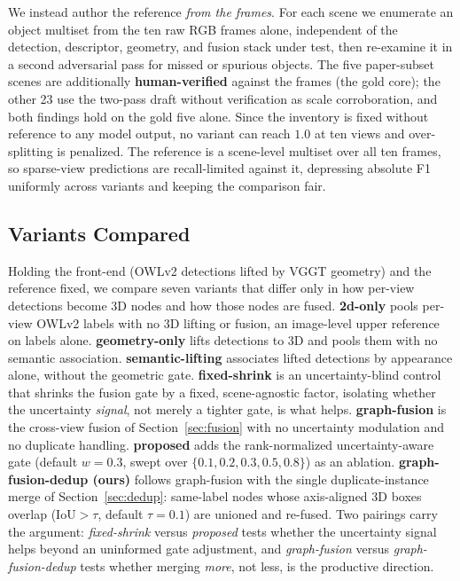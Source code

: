 We instead author the reference \emph{from the frames}. For each scene we enumerate an object multiset from the ten raw RGB frames alone, independent of the detection, descriptor, geometry, and fusion stack under test, then re-examine it in a second adversarial pass for missed or spurious objects. The five paper-subset scenes are additionally \textbf{human-verified} against the frames (the gold core); the other 23 use the two-pass draft without verification as scale corroboration, and both findings hold on the gold five alone. Since the inventory is fixed without reference to any model output, no variant can reach $1.0$ at ten views and over-splitting is penalized. The reference is a scene-level multiset over all ten frames, so sparse-view predictions are recall-limited against it, depressing absolute F1 uniformly across variants and keeping the comparison fair.

\subsection{Variants Compared}
\label{sec:exp_variants}

Holding the front-end (OWLv2 detections lifted by VGGT geometry) and the reference fixed, we compare seven variants that differ only in how per-view detections become 3D nodes and how those nodes are fused. \textbf{2d-only} pools per-view OWLv2 labels with no 3D lifting or fusion, an image-level upper reference on labels alone. \textbf{geometry-only} lifts detections to 3D and pools them with no semantic association. \textbf{semantic-lifting} associates lifted detections by appearance alone, without the geometric gate. \textbf{fixed-shrink} is an uncertainty-blind control that shrinks the fusion gate by a fixed, scene-agnostic factor, isolating whether the uncertainty \emph{signal}, not merely a tighter gate, is what helps. \textbf{graph-fusion} is the cross-view fusion of Section~\ref{sec:fusion} with no uncertainty modulation and no duplicate handling. \textbf{proposed} adds the rank-normalized uncertainty-aware gate (default $w{=}0.3$, swept over $\{0.1,0.2,0.3,0.5,0.8\}$) as an ablation. \textbf{graph-fusion-dedup (ours)} follows graph-fusion with the single duplicate-instance merge of Section~\ref{sec:dedup}: same-label nodes whose axis-aligned 3D boxes overlap ($\mathrm{IoU}>\tau$, default $\tau{=}0.1$) are unioned and re-fused. Two pairings carry the argument: \emph{fixed-shrink} versus \emph{proposed} tests whether the uncertainty signal helps beyond an uninformed gate adjustment, and \emph{graph-fusion} versus \emph{graph-fusion-dedup} tests whether merging \emph{more}, not less, is the productive direction.

